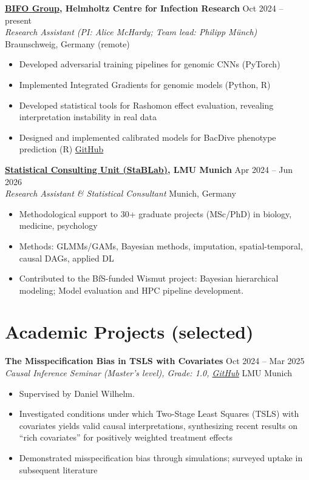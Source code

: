 \documentclass[a4paper,11pt]{article}
\newcommand{\entry}[4]{%
  \textbf{#1} \hfill #2\\
  \textit{#3} \hfill #4\par
}
\begin{document}
\entry{\href{https://www.helmholtz-hzi.de/en/research/research-groups/details/computational-biology-for-infection-research/}{BIFO Group}, Helmholtz Centre for Infection Research}{Oct 2024 -- present}
      {Research Assistant (PI: Alice McHardy; Team lead: Philipp Münch)}{Braunschweig, Germany (remote)}
\begin{itemize}[leftmargin=1.5em, itemsep=0pt, parsep=0.1em, topsep=0.1em]
\item Developed adversarial training pipelines for genomic CNNs (PyTorch)
\item Implemented Integrated Gradients for genomic models (Python, R)
\item Developed statistical tools for Rashomon effect evaluation, revealing interpretation instability in real data
\item Designed and implemented calibrated models for BacDive phenotype prediction (R) \href{https://github.com/GenomeNet/BacDive-Calibration}{GitHub}
\end{itemize}

\pagebreak

\entry{\href{https://www.stat.lmu.de/stablab/de/}{Statistical Consulting Unit (StaBLab)}, LMU Munich}{Apr 2024 -- Jun 2026}
      {Research Assistant \& Statistical Consultant}{Munich, Germany}
\begin{itemize}[leftmargin=1.5em, itemsep=0pt, parsep=0.1em, topsep=0.1em]
\item Methodological support to 30+ graduate projects (MSc/PhD) in biology, medicine, psychology
\item Methods: GLMMs/GAMs, Bayesian methods, imputation, spatial-temporal, causal DAGs, applied DL
\item Contributed to the BfS-funded Wismut project: Bayesian hierarchical modeling; Model evaluation and HPC pipeline development.
\end{itemize}


\section*{Academic Projects (selected)}

\entry{The Misspecification Bias in TSLS with Covariates}{Oct 2024 -- Mar 2025}
      {Causal Inference Seminar (Master's level), Grade: 1.0, \href{https://github.com/YHan228/Causal_TSLS}{GitHub}}{LMU Munich}
\begin{itemize}[leftmargin=1.5em, itemsep=0pt, parsep=0.1em, topsep=0.1em]
\item Supervised by Daniel Wilhelm.
\item Investigated conditions under which Two-Stage Least Squares (TSLS) with covariates yields valid causal interpretations, synthesizing recent results on ``rich covariates'' for positively weighted treatment effects
\item Demonstrated misspecification bias through simulations; surveyed uptake in subsequent literature
\end{itemize}
\end{document}
